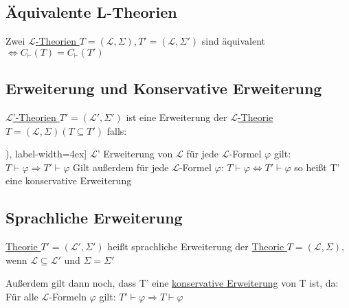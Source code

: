 \documentclass[12pt,a4paper]{article} %
\begin{document}
	\subsection{Äquivalente L-Theorien}
	Zwei \hyperref[Theorie]{$\mathcal{L}$-Theorien $T = (\mathcal{L}, \Sigma), T' = (\mathcal{L}, \Sigma')$} sind äquivalent $\Leftrightarrow C_{\vdash}(T) = C_{\vdash}(T')$
	
	\subsection{Erweiterung und Konservative Erweiterung}
	\label{Erweiterung}
	\hyperref[Theorie]{$\mathcal{L}$'-Theorien $T' = (\mathcal{L}', \Sigma')$} ist eine Erweiterung der \hyperref[Theorie]{$\mathcal{L}$-Theorie $T = (\mathcal{L}, \Sigma) (T \subseteq T')$} falls:
	\begin{tasks}[counter-format=(tsk[r]), label-width=4ex]
		\task $\mathcal{L}$' Erweiterung von $\mathcal{L}$
		\task für jede $\mathcal{L}$-Formel $\varphi$ gilt: $T \hyperref[Beweisbar]{\vdash} \varphi \Rightarrow T' \hyperref[Beweisbar]{\vdash} \varphi$ \newline
		Gilt außerdem für jede $\mathcal{L}$-Formel $\varphi$: $T \hyperref[Beweisbar]{\vdash} \varphi \Leftrightarrow T' \hyperref[Beweisbar]{\vdash} \varphi$ so heißt T' eine konservative Erweiterung
	\end{tasks}

	\subsection{Sprachliche Erweiterung}
	\label{SprachlicheErweiterung}
	\hyperref[Theorie]{Theorie $T' = (\mathcal{L}', \Sigma')$} heißt sprachliche Erweiterung der \hyperref[Theorie]{Theorie $T = (\mathcal{L}, \Sigma)$}, wenn $\mathcal{L} \subseteq \mathcal{L}'$ und $\Sigma = \Sigma'$
	
	Außerdem gilt dann noch, dass T' eine \hyperref[Erweiterung]{konservative Erweiterung} von T ist, da: Für alle $\mathcal{L}$-Formeln $\varphi$ gilt: $T' \hyperref[Beweisbar]{\vdash} \varphi \Rightarrow T \hyperref[Beweisbar]{\vdash} \varphi$
	
\end{document}
